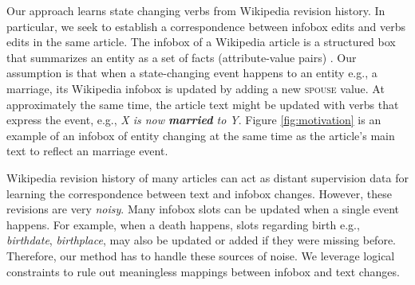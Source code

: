   

Our approach learns state changing verbs from Wikipedia revision history. In particular, we seek to establish a correspondence between infobox edits and verbs edits in the same article. The infobox of a  Wikipedia article is  a structured box that summarizes an entity as a set of facts (attribute-value pairs) . Our assumption is that when a state-changing event happens to an entity e.g., a marriage, its Wikipedia infobox is  updated by adding a new \textsc{spouse} value. 
At approximately the same time, the article text  might be updated with verbs that express the event, e.g., \textit{X is now \textbf{married} to Y}.  Figure \ref{fig:motivation} is an example of an infobox of entity changing at the same time as the article's main text to reflect an marriage event.

Wikipedia revision history of many articles can act as distant supervision  data for learning the correspondence between text and infobox changes. However, these revisions are very  \textit{noisy}.  Many infobox slots can be  updated when a single event happens.
For example, when a death happens, slots regarding birth e.g., \textit{birthdate}, \textit{birthplace}, may also be updated or added if they were missing before.
Therefore, our method has to handle these sources of noise.  We leverage logical constraints  to rule out meaningless mappings  between infobox and text changes. 


